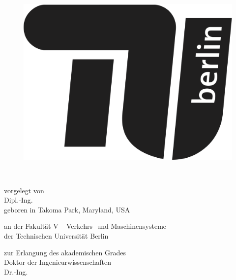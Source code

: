 
\thispagestyle{empty}

\begin{flushright}

	\begin{figure}[!h]
  	\begin{minipage}{1.8\linewidth}
	\begin{center}
	\includegraphics[scale=0.075]{chapters/title/TU-logo-kurz-1c-schwarz.png}
  	\end{center}
  	\end{minipage}
	\end{figure}

	\vspace{20mm}

	\LARGE

	\textbf{\hspace{60mm}\Title} \\[2cm]

	\hrulefill

	\large
	vorgelegt von\\

	Dipl.-Ing. \Autor\\
	geboren in Takoma Park, Maryland, USA\\
	\vspace{10mm}

	an der Fakultät V -- Verkehrs- und Maschinensysteme\\
	der Technischen Universität Berlin

	zur Erlangung des akademischen Grades\\
	Doktor der Ingenieurwissenschaften\\
	Dr.-Ing.\\
	\vspace{5mm}


\end{flushright}
